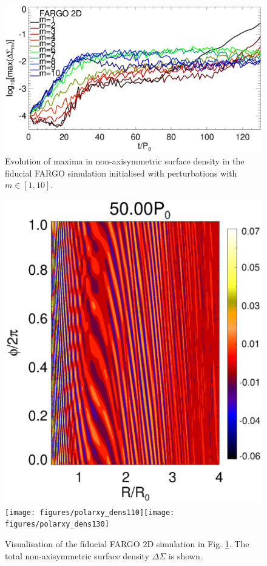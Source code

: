 \begin{figure}
  \includegraphics[width=\linewidth]{figures/nonaxi_evol_DZ_fargo}
  \caption{Evolution of maxima in non-axisymmetric surface density 
    in the fiducial FARGO simulation initialised with perturbations
    with $m\in[1,10]$.\label{fargo_modeamp}} 
\end{figure}

\begin{figure}
  \includegraphics[scale=0.27]{figures/polarxy_dens050}\texttt{[image: figures/polarxy\_dens110]}\texttt{[image: figures/polarxy\_dens130]} 
  \caption{Visualisation of the fiducial FARGO 2D simulation in
    Fig. \ref{fargo_modeamp}. The total  
    non-axisymmetric surface density
    $\Delta\Sigma$ is shown. \label{fargo_2d}} 
\end{figure}


